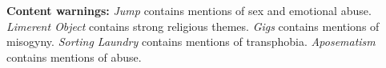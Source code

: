 \null

\vfill

\noindent \textbf{Content warnings:} \emph{Jump} contains mentions of sex and emotional abuse. \emph{Limerent Object} contains strong religious themes. \emph{Gigs} contains mentions of misogyny. \emph{Sorting Laundry} contains mentions of transphobia. \emph{Aposematism} contains mentions of abuse.
